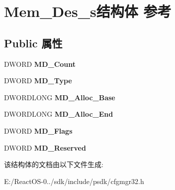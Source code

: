 \hypertarget{struct_mem___des__s}{}\section{Mem\+\_\+\+Des\+\_\+s结构体 参考}
\label{struct_mem___des__s}
\subsection*{Public 属性}
\begin{DoxyCompactItemize}
\item 
\mbox{\label{struct_mem___des__s_a7e6e56f146f2d84d1b6c1b2fbb1803e8}} 
D\+W\+O\+RD {\bfseries M\+D\+\_\+\+Count}
\item 
\mbox{\label{struct_mem___des__s_ad3a2d21ee720ec72147cf5a7d525fc2c}} 
D\+W\+O\+RD {\bfseries M\+D\+\_\+\+Type}
\item 
\mbox{\label{struct_mem___des__s_ae99697bbb480352c90f294e94d720b33}} 
D\+W\+O\+R\+D\+L\+O\+NG {\bfseries M\+D\+\_\+\+Alloc\+\_\+\+Base}
\item 
\mbox{\label{struct_mem___des__s_a01e5b944ee8fe81bcbbcf72fc8862ac8}} 
D\+W\+O\+R\+D\+L\+O\+NG {\bfseries M\+D\+\_\+\+Alloc\+\_\+\+End}
\item 
\mbox{\label{struct_mem___des__s_a5f55f6ebc6aeb75a94370aeb6aa58359}} 
D\+W\+O\+RD {\bfseries M\+D\+\_\+\+Flags}
\item 
\mbox{\label{struct_mem___des__s_ae2218fedbd7598db3aeee0729cecbcf2}} 
D\+W\+O\+RD {\bfseries M\+D\+\_\+\+Reserved}
\end{DoxyCompactItemize}


该结构体的文档由以下文件生成\+:\begin{DoxyCompactItemize}
\item 
E\+:/\+React\+O\+S-\/0../sdk/include/psdk/cfgmgr32.\+h\end{DoxyCompactItemize}
